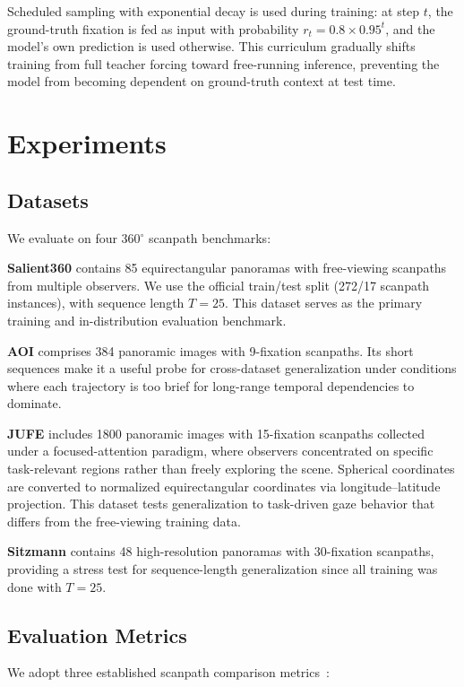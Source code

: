 \documentclass[sigconf]{acmart}
\begin{document}
Scheduled sampling with exponential decay is used during training: at step $t$, the ground-truth fixation is fed as input with probability $r_t = 0.8 \times 0.95^t$, and the model's own prediction is used otherwise. This curriculum gradually shifts training from full teacher forcing toward free-running inference, preventing the model from becoming dependent on ground-truth context at test time.

\FloatBarrier
\section{Experiments}

\subsection{Datasets}
We evaluate on four 360$^\circ$ scanpath benchmarks:

\textbf{Salient360} contains 85 equirectangular panoramas with free-viewing scanpaths from multiple observers. We use the official train/test split (272/17 scanpath instances), with sequence length $T=25$. This dataset serves as the primary training and in-distribution evaluation benchmark.

\textbf{AOI} comprises 384 panoramic images with 9-fixation scanpaths. Its short sequences make it a useful probe for cross-dataset generalization under conditions where each trajectory is too brief for long-range temporal dependencies to dominate.

\textbf{JUFE} includes 1800 panoramic images with 15-fixation scanpaths collected under a focused-attention paradigm, where observers concentrated on specific task-relevant regions rather than freely exploring the scene. Spherical coordinates are converted to normalized equirectangular coordinates via longitude--latitude projection. This dataset tests generalization to task-driven gaze behavior that differs from the free-viewing training data.

\textbf{Sitzmann} contains 48 high-resolution panoramas with 30-fixation scanpaths, providing a stress test for sequence-length generalization since all training was done with $T=25$.

\subsection{Evaluation Metrics}
We adopt three established scanpath comparison metrics~\cite{fahimi2021scanpathmetrics,bylinskii2019metrics}:
\end{document}

